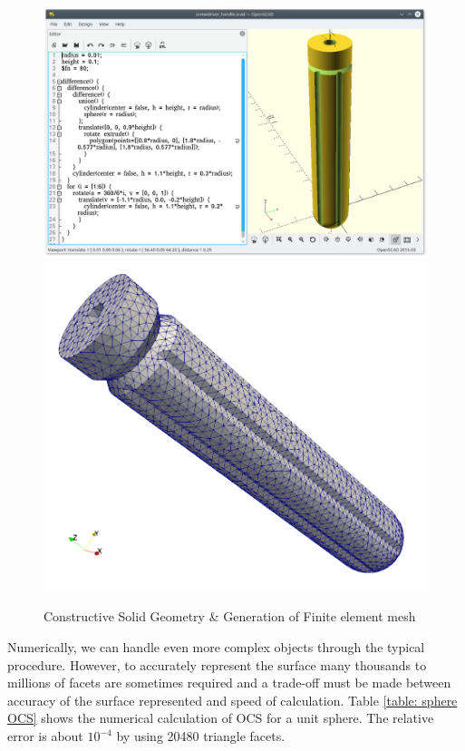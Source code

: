 \documentclass[11pt]{amsart}
\theoremstyle{definition}
\begin{document}
\begin{figure}[H]   	
\centerline{\includegraphics[scale=0.3]{./figs/sdh_openscad}
     	\hspace{-6pt}
		\includegraphics[scale=0.2]{./figs/sdh_mesh}}
     	\hspace{-6pt}
		\caption{Constructive Solid Geometry \& Generation of Finite element mesh ~\cite{mesh}}
        \label{fig:sdh_openscad}
\end{figure}

Numerically, we can handle even more complex objects through the typical procedure. However, to accurately represent the surface many thousands to millions of facets are sometimes required and a trade-off must be made between accuracy of the surface represented and speed of calculation. Table \ref{table: sphere OCS} shows the numerical calculation of OCS for a unit sphere. The relative error is about $10^{-4}$ by using 20480 triangle facets.  
\end{document}
